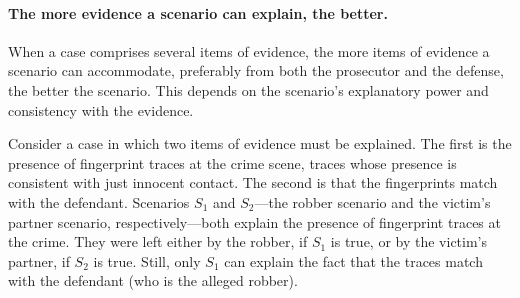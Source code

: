 \documentclass[10pt]{article}
\begin{document}
 


\paragraph{The more evidence a scenario can explain, the better.}

When a case comprises several items of evidence, 
 the more items of evidence a scenario can accommodate, preferably from both the prosecutor and the defense, 
 the better the scenario. This depends on the scenario's explanatory power and consistency with the evidence. 
 
 Consider a case in which two items of evidence must be explained. The first 
 is the presence of fingerprint traces at the crime scene, traces whose 
 presence is consistent with just innocent contact. The second is that the fingerprints match with the defendant. 
Scenarios $S_1$ and $S_2$---the robber scenario and the victim's 
partner scenario, respectively---both explain the presence of fingerprint traces at the crime. They were left either by 
the robber, if $S_1$ is true, or by the victim's partner, if $S_2$ is true. Still, 
only $S_1$ can explain the fact that the traces match with the defendant 
(who is the alleged robber). 
%
%
\end{document}
